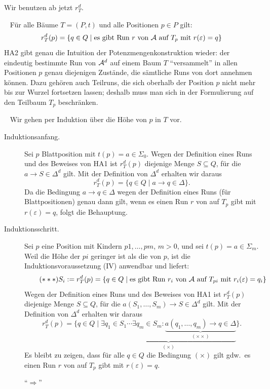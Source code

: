 \documentclass[fontsize=11pt, twoside=false, numbers=autoenddot]{scrbook}
\begin{document}
\parII
Wir benutzen ab jetzt $r_T^d$.

\parII
{}~ Für alle Bäume $T=(P,t)$ und alle Positionen $p \in P$ gilt:
\[
  r_T^d(p) = \{q \in Q \mid \text{es gibt Run $r$ von $\mathcal{A}$ auf $T_p$ mit $r(\varepsilon)=q$}\}
\]
HA2 gibt genau die Intuition der Potenzmengenkonstruktion wieder:
der eindeutig bestimmte Run von $\mathcal{A}^d$ auf einem Baum $T$
"`versammelt"' in allen Positionen $p$ genau diejenigen Zustände,
die sämtliche Runs von \Amc dort annehmen können.
Dazu gehören auch Teilruns, die sich oberhalb der Position $p$
nicht mehr bis zur Wurzel fortsetzen lassen;
deshalb muss man sich in der Formulierung auf den Teilbaum $T_p$ beschränken.

\parII
\goodbreak
{}~
Wir gehen per Induktion über die Höhe von $p$ in $T$ vor.
%
\begin{description}
  \item[Induktionsanfang.]
    Sei $p$ Blattposition mit $t(p) = a \in \Sigma_0$.
    Wegen der Definition eines Runs und des Beweises von HA1 ist
    $r_T^d(p)$ diejenige Menge $S \subseteq Q$, für die $a \to S \in \Delta^d$ gilt.
    Mit der Definition von $\Delta^d$ erhalten wir daraus
    \[
       r_T^d(p) = \{q \in Q \mid a \to q \in \Delta\}.
    \]
    Da die Bedingung $a \to q \in \Delta$ wegen der Definition eines Runs (für Blattpositionen)
    genau dann gilt, wenn es einen Run $r$ von \Amc auf $T_p$ gibt mit $r(\varepsilon) = q$,
    folgt die Behauptung.
  \item[Induktionsschritt.]
    Sei $p$ eine Position mit Kindern $p1,\dots,pm$, $m > 0$,
    und sei $t(p) = a \in \Sigma_m$.
    Weil die Höhe der $pi$ geringer ist als die von $p$,
    ist die Induktionsvoraussetzung (IV) anwendbar
    und liefert:
    \[
      \tag{$***$}
      S_i := r_T^d(p) = \{q \in Q \mid \text{es gibt Run $r_i$ von \Amc auf $T_{pi}$ mit $r_i(\varepsilon)=q_i$}\}
    \]
    Wegen der Definition eines Runs und des Beweises von HA1 ist
    $r_T^d(p)$ diejenige Menge $S \subseteq Q$, für die $a(S_1,\dots,S_m) \to S \in \Delta^d$ gilt.
    Mit der Definition von $\Delta^d$ erhalten wir daraus
    \[
       r_T^d(p) = \{q \in Q \mid \underbrace{\exists q_1 \in S_1 \cdots \exists q_m \in S_m : \underbrace{a(q_1,\dots,q_m) \to q \in \Delta}_{(\times\times)}}_{(\times)}\}.
    \]
    Es bleibt zu zeigen, dass für alle $q \in Q$ die Bedingung $(\times)$
    gilt gdw.\ es einen Run $r$ von \Amc auf $T_p$ gibt mit $r(\varepsilon)=q$.
    \begin{description}
      \item[{\boldmath "`$\Rightarrow$"'}]

\end{description}
\end{description}
\end{document}
